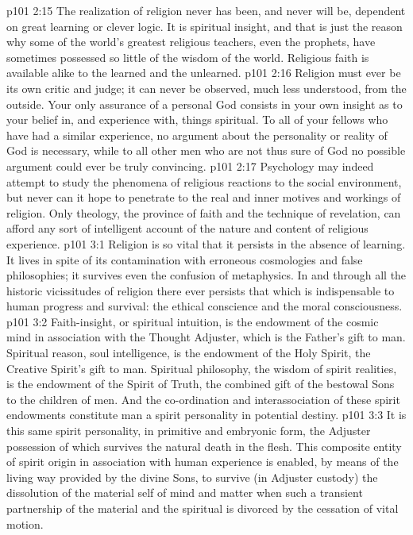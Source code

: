 \vs p101 2:15 \pc The realization of religion never has been, and never will be, dependent on great learning or clever logic. It is spiritual insight, and that is just the reason why some of the world’s greatest religious teachers, even the prophets, have sometimes possessed so little of the wisdom of the world. Religious faith is available alike to the learned and the unlearned.
\vs p101 2:16 Religion must ever be its own critic and judge; it can never be observed, much less understood, from the outside. Your only assurance of a personal God consists in your own insight as to your belief in, and experience with, things spiritual. To all of your fellows who have had a similar experience, no argument about the personality or reality of God is necessary, while to all other men who are not thus sure of God no possible argument could ever be truly convincing.
\vs p101 2:17 Psychology may indeed attempt to study the phenomena of religious reactions to the social environment, but never can it hope to penetrate to the real and inner motives and workings of religion. Only theology, the province of faith and the technique of revelation, can afford any sort of intelligent account of the nature and content of religious experience.
\vs p101 3:1 Religion is so vital that it persists in the absence of learning. It lives in spite of its contamination with erroneous cosmologies and false philosophies; it survives even the confusion of metaphysics. In and through all the historic vicissitudes of religion there ever persists that which is indispensable to human progress and survival: the ethical conscience and the moral consciousness.
\vs p101 3:2 Faith\hyp{}insight, or spiritual intuition, is the endowment of the cosmic mind in association with the Thought Adjuster, which is the Father’s gift to man. Spiritual reason, soul intelligence, is the endowment of the Holy Spirit, the Creative Spirit’s gift to man. Spiritual philosophy, the wisdom of spirit realities, is the endowment of the Spirit of Truth, the combined gift of the bestowal Sons to the children of men. And the co\hyp{}ordination and interassociation of these spirit endowments constitute man a spirit personality in potential destiny.
\vs p101 3:3 It is this same spirit personality, in primitive and embryonic form, the Adjuster possession of which survives the natural death in the flesh. This composite entity of spirit origin in association with human experience is enabled, by means of the living way provided by the divine Sons, to survive (in Adjuster custody) the dissolution of the material self of mind and matter when such a transient partnership of the material and the spiritual is divorced by the cessation of vital motion.
